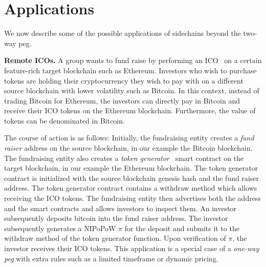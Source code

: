 \section{Applications}

We now describe some of the possible applications of sidechains beyond the
two-way peg.

\noindent
\textbf{Remote ICOs. } A group wants to fund raise by performing an
ICO~\cite{ico} on a certain feature-rich target blockchain such as
Ethereum. Investors who wish to purchase tokens are holding their cryptocurrency
they wish to pay with on a different source blockchain with lower
volatility such as Bitcoin. In this context, instead of trading Bitcoin for
Ethereum, the investors can directly pay in Bitcoin and receive their ICO tokens
on the Ethereum blockchain. Furthermore, the value of tokens can be denominated
in Bitcoin.

The course of action is as follows: Initially, the fundraising entity creates a
\emph{fund raiser} address on the source blockchain, in our example the
Bitcoin blockchain. The fundraising entity also creates a
\emph{token generator}~\cite{openzeppelin-crowdsale} smart contract on the
target blockchain, in our example the Ethereum blockchain. The
token generator contract is initialized with the source blockchain
genesis hash and the fund raiser address. The token generator contract contains
a \textsf{withdraw} method which allows receiving the ICO tokens. The fundraising
entity then advertises both the address and the smart contracts and allows
investors to inspect them. An investor subsequently deposits bitcoin into the
fund raiser address. The investor subsequently generates a NIPoPoW $\pi$
for the deposit and submits it to the \textsf{withdraw} method of the token
generator function. Upon verification of $\pi$, the investor receives their ICO
tokens. This application is a special case of a \emph{one-way peg} with
extra rules such as a limited timeframe or dynamic pricing.

